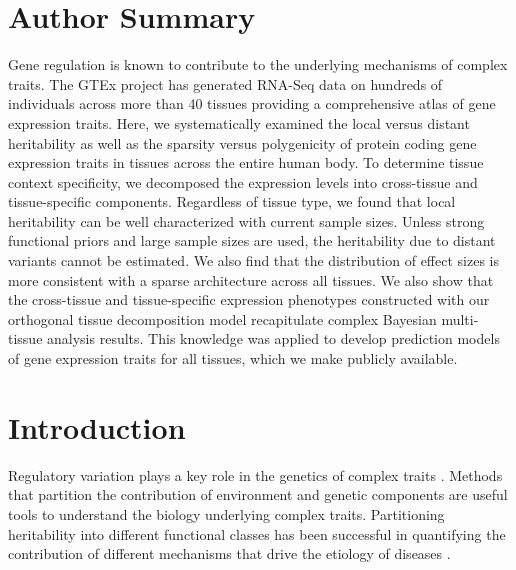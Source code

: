 \documentclass[10pt,letterpaper]{article}
\begin{document}
\section*{Author Summary} %
Gene regulation is known to contribute to the underlying mechanisms of complex traits. The GTEx project has generated RNA-Seq data on hundreds of individuals across more than 40 tissues providing a comprehensive atlas of gene expression traits. Here, we systematically examined the local versus distant heritability as well as the sparsity versus polygenicity of protein coding gene expression traits in tissues across the entire human body. To determine tissue context specificity, we decomposed the expression levels into cross-tissue and tissue-specific components. Regardless of tissue type, we found that local heritability can be well characterized with current sample sizes. Unless strong functional priors and large sample sizes are used, the heritability due to distant variants cannot be estimated. We also find that the distribution of effect sizes is more consistent with a sparse architecture across all tissues. We also show that the cross-tissue and tissue-specific expression phenotypes constructed with our orthogonal tissue decomposition model recapitulate complex Bayesian multi-tissue analysis results. This knowledge was applied to develop prediction models of gene expression traits for all tissues, which we make publicly available.

\linenumbers


\section*{Introduction}
Regulatory variation plays a key role in the genetics of complex traits \cite{Nicolae_2010, Nica_2010, Gusev_2014}. Methods that partition the contribution of environment and genetic components are useful tools to understand the biology underlying complex traits. Partitioning heritability into different functional classes has been successful in quantifying the contribution of different mechanisms that drive the etiology of diseases \cite{Gusev_2014,torres2014cross,davis2013partitioning}.
\end{document}
